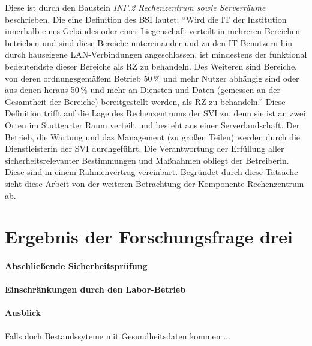 Diese ist durch den Baustein \textit{INF.2 Rechenzentrum sowie Serverräume} beschrieben. Die eine Definition des \ac{BSI} lautet: \enquote{Wird die IT der Institution innerhalb eines Gebäudes oder einer Liegenschaft verteilt in mehreren Bereichen betrieben und sind diese Bereiche untereinander und zu den IT-Benutzern hin durch hauseigene LAN-Verbindungen angeschlossen, ist mindestens der funktional bedeutendste dieser Bereiche als RZ zu behandeln. Des Weiteren sind Bereiche, von deren ordnungsgemäßem Betrieb 50\,\% und mehr Nutzer abhängig sind oder aus denen heraus 50\,\% und mehr an Diensten und Daten (gemessen an der Gesamtheit der Bereiche) bereitgestellt werden, als RZ zu behandeln.}\autocite[][S.\,755]{bundesamt_fur_sicherheit_in_der_informationstechnik_bsi_it-grundschutz-kompendium_2020} Diese Definition trifft auf die Lage des Rechenzentrums der \ac{SVI} zu, denn sie ist an zwei Orten im Stuttgarter Raum verteilt und besteht aus einer Serverlandschaft. Der Betrieb, die Wartung und das Management (zu großen Teilen) werden durch die Dienstleisterin der \ac{SVI} durchgeführt. Die Verantwortung der Erfüllung aller sicherheitsrelevanter Bestimmungen und Maßnahmen obliegt der Betreiberin. Diese sind in einem Rahmenvertrag vereinbart. Begründet durch diese Tatsache sieht diese Arbeit von der weiteren Betrachtung der Komponente Rechenzentrum ab.


\section{Ergebnis der Forschungsfrage drei}

\paragraph{Abschließende Sicherheitsprüfung}

\paragraph{Einschränkungen durch den Labor-Betrieb}

\paragraph{Ausblick} Falls doch Bestandssyteme mit Gesundheitsdaten kommen ...
